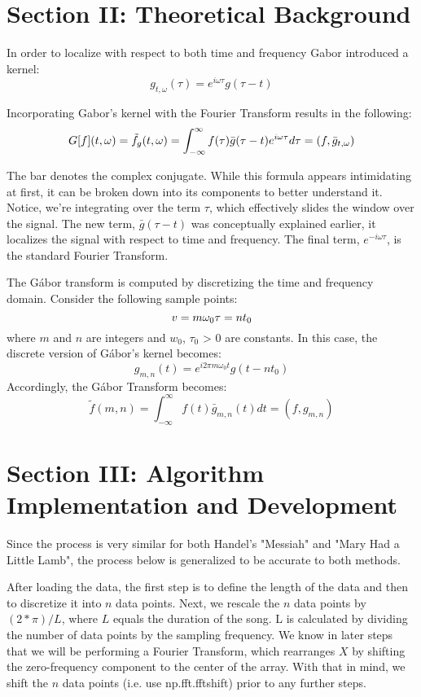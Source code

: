 \documentclass{cup-pan}
\begin{document}
\section{Section II: Theoretical Background}

In order to localize with respect to both time and frequency Gabor introduced a kernel:  
$$g_{t, \omega}(\tau) = e^{i \omega \tau}g(\tau - t)$$

\vskip 0.1in
\noindent
Incorporating Gabor's kernel with the Fourier Transform results in the following:  
$$G[f](t,\omega) = \tilde{f}_g(t,\omega) = \int_{-\infty}^{\infty} \space f(\tau) \bar{g}(\tau - t) \space e^{i \omega \tau} d \tau \space = \space (f, \bar g_{t,\omega})$$

\vskip 0.1in
\noindent
The bar denotes the complex conjugate.  While this formula appears intimidating at first, it can be broken down into its components to better understand it.  Notice, we're integrating over the term $\tau$, which effectively slides the window over the signal.  The new term, $\bar g (\tau - t)$ was conceptually explained earlier, it localizes the signal with respect to time and frequency.  The final term, $e^{-i \omega \tau}$, is the standard Fourier Transform.  

\vskip 0.1in
\noindent
The Gábor transform is computed by discretizing the time and frequency domain.  Consider the following sample points:  
$$ v = m \omega_0 \\ 
\tau = n t_0$$
where $m$ and $n$ are integers and $w_0$, $\tau_0$ > 0 are constants. In this case, the discrete version of Gábor's kernel becomes:
$$g_{m,n}(t) = e^{i 2 \pi m \omega_0 t} g(t-n t_0)$$
Accordingly, the Gábor Transform becomes:
$$\tilde{f}(m,n) = \int^{\infty}_{-\infty} f(t) \bar g_{m,n}(t) dt = (f,g_{m,n})$$


\section{Section III:  Algorithm Implementation and Development}

Since the process is very similar for both Handel's "Messiah" and "Mary Had a Little Lamb", the process below is generalized to be accurate to both methods. 

\vskip 0.1in
\noindent
After loading the data, the first step is to define the length of the data and then to discretize it into $n$ data points. Next, we rescale the $n$ data points by $(2 * \pi) / L$, where $L$ equals the duration of the song. L is calculated by dividing the number of data points by the sampling frequency.  We know in later steps that we will be performing a Fourier Transform, which rearranges $X$ by shifting the zero-frequency component to the center of the array.  With that in mind, we shift the $n$ data points (i.e. use np.fft.fftshift) prior to any further steps.  
\end{document}
